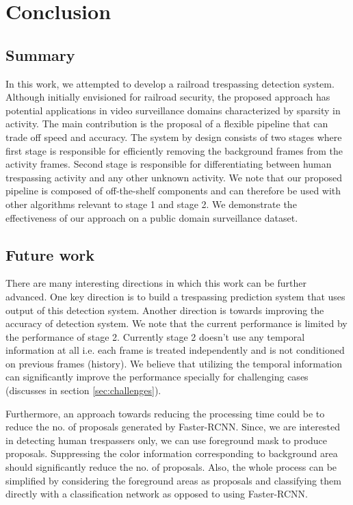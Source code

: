 \section{Conclusion}

\subsection{Summary}
In this work, we attempted to develop a railroad trespassing detection system. Although initially envisioned for railroad security, the proposed approach has potential applications in video surveillance domains characterized by sparsity in activity. The main contribution is the proposal of a flexible pipeline that can trade off speed and accuracy. The system by design consists of two stages where first stage is responsible for efficiently removing the background frames from the activity frames. Second stage is responsible for differentiating between human trespassing activity and any other unknown activity. We note that our proposed pipeline is composed of off-the-shelf components and can therefore be used with other algorithms relevant to stage 1 and stage 2. We demonstrate the effectiveness of our approach on a public domain surveillance dataset. 

\subsection{Future work}
There are many interesting directions in which this work can be further advanced. One key direction is to build a trespassing prediction system that uses output of this detection system. Another direction is towards improving the accuracy of detection system. We note that the current performance is limited by the performance of stage 2. Currently stage 2 doesn't use any temporal information at all i.e. each frame is treated independently and is not conditioned on previous frames (history). We believe that utilizing the temporal information can significantly improve the performance specially for challenging cases (discusses in section \ref{sec:challenges}). 

Furthermore, an approach towards reducing the processing time could be to reduce the no. of proposals generated by Faster-RCNN. Since, we are interested in detecting human trespassers only, we can use foreground mask to produce proposals. Suppressing the color information corresponding to background area should significantly reduce the no. of proposals. Also, the whole process can be simplified by considering the foreground areas as proposals and classifying them directly with a classification network as opposed to using Faster-RCNN. 

\newpage